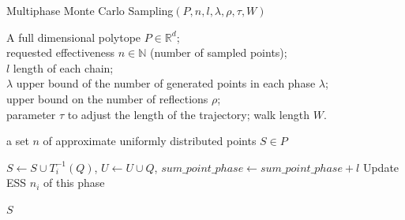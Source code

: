    \begin{algorithm}
      \centering
      \caption{Multiphase Monte Carlo Sampling$(P, n, l, \lambda, \rho, \tau, W)$}
      \label{alg:MMCS}
      \medskip
      \begin{algorithmic}

      \REQUIRE
      A full dimensional polytope $P\in\mathbb{R}^d$; \\
      requested effectiveness $n\in\mathbb{N}$ (number of sampled points); \\
      $l$ length of each chain;\\ $\lambda$ upper bound of the number of generated points in each phase $\lambda$;  \\
      upper bound on the number of reflections $\rho$;\\
      parameter $\tau$ to adjust the length of the  trajectory; walk length $W$.

      \item[]
      
      \ENSURE
      a set $n$ of approximate uniformly distributed points $S\in P$

      \item[]



      
         

            \ENDFOR
            

            $S\leftarrow S\cup T_i^{-1}(Q)$,\;
            $U\leftarrow U\cup Q$,\;
            $sum\_point\_phase\leftarrow sum\_point\_phase + l$\;
            Update ESS $n_i$ of this phase\;
            \ENDIF

         \ENDWHILE

         
      \ENDWHILE
   
      \RETURN $S$
      \end{algorithmic}
   \end{algorithm}



